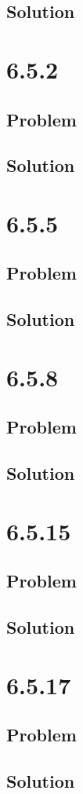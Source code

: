\documentclass[12pt]{article}
\begin{document}
\subsection{Solution}

\newpage
\section{6.5.2}

\subsection{Problem}

\subsection{Solution}

\newpage
\section{6.5.5}

\subsection{Problem}

\subsection{Solution}

\newpage
\section{6.5.8}

\subsection{Problem}

\subsection{Solution}

\newpage
\section{6.5.15}

\subsection{Problem}

\subsection{Solution}

\newpage
\section{6.5.17}

\subsection{Problem}

\subsection{Solution}

\newpage


\nocite{El-Deeb_PEU-356_Assignments}
\end{document}
